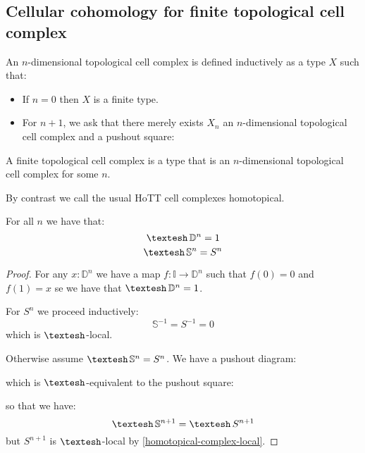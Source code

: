 \subsection{Cellular cohomology for finite topological cell complex}

\begin{definition}
An $n$-dimensional topological cell complex is defined inductively as a type $X$ such that:
\begin{itemize} 
\item If $n=0$ then $X$ is a finite type.
\item For $n+1$, we ask that there merely exists $X_n$ an $n$-dimensional topological cell complex and a pushout square:
\begin{center}
\end{center}
\end{itemize}
A finite topological cell complex is a type that is an $n$-dimensional topological cell complex for some $n$.
\end{definition}

By contrast we call the usual HoTT cell complexes homotopical.

\begin{lemma}\label{shape-spheres-disks}
For all $n$ we have that:
\[\shape \mathbb{D}^n = 1\]
\[\shape \mathbb{S}^n = S^n\]
\end{lemma}

\begin{proof}
For any $x:\mathbb{D}^n$ we have a map $f:\mathbb{I}\to\mathbb{D}^n$ such that $f(0)=0$ and $f(1)=x$ se we have that $\shape\mathbb{D}^n = 1$.

For $S^n$ we proceed inductively:
\[\mathbb{S}^{-1} = S^{-1} = 0\]
which is $\shape$-local. 

Otherwise assume $\shape \mathbb{S}^n = S^n$. We have a pushout diagram:
\begin{center}
\end{center}
which is $\shape$-equivalent to the pushout square:
\begin{center}
\end{center}
so that we have:
\[\shape \mathbb{S}^{n+1} = \shape S^{n+1}\]
but $S^{n+1}$ is $\shape$-local by \cref{homotopical-complex-local}.
\end{proof}

